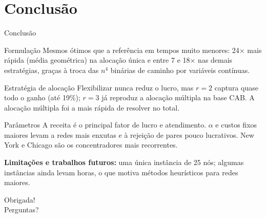 \documentclass[aspectratio=169, 10pt]{beamer}
\begin{document}
\section{Conclusão}

\begin{frame}{Conclusão}
  \small
  \begin{block}{Formulação}
    \scriptsize
    Mesmos ótimos que a referência em tempos muito menores: \alert{24$\times$ mais rápida} (média geométrica) na alocação única e entre 7 e 18$\times$ nas demais estratégias, graças à troca das $n^4$ binárias de caminho por variáveis contínuas.
  \end{block}
  \begin{block}{Estratégia de alocação}
    \scriptsize
    Flexibilizar nunca reduz o lucro, mas \alert{$r=2$ captura quase todo o ganho} (até 19\%); $r=3$ já reproduz a alocação múltipla na base CAB. A alocação múltipla foi a mais rápida de resolver no total.
  \end{block}
  \begin{block}{Parâmetros}
    \scriptsize
    A receita é o principal fator de lucro e atendimento. $\alpha$ e custos fixos maiores levam a redes mais enxutas e à rejeição de pares pouco lucrativos. New York e Chicago são os concentradores mais recorrentes.
  \end{block}
  \vspace{0.1cm}
  {\scriptsize\textbf{Limitações e trabalhos futuros:} uma única instância de 25 nós; algumas instâncias ainda levam horas, o que motiva métodos heurísticos para redes maiores.}
\end{frame}

\begin{frame}[standout]
  Obrigada!\\[0.4cm]
  {\normalsize Perguntas?}
\end{frame}
\end{document}
